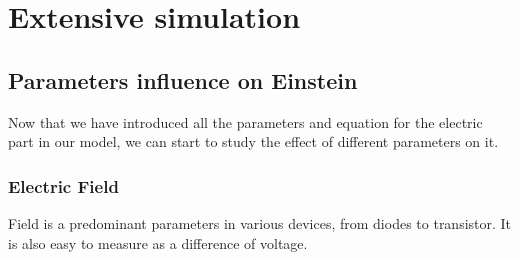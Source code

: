 
\chapter{Extensive simulation}

\section{Parameters influence on Einstein}

Now that we have introduced all the parameters and equation for the electric part in our model, we can start to study the effect of different parameters on it.

\subsection{Electric Field}

Field is a predominant parameters in various devices, from diodes to transistor. It is also easy to measure as a difference of voltage.

